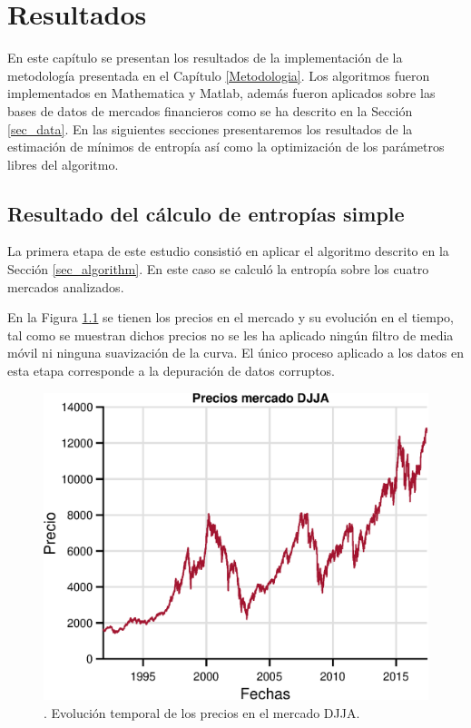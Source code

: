 %
\chapter{Resultados}
\label{Resultados}

En este capítulo se presentan los resultados de la implementación de la metodología presentada en el Capítulo \ref{Metodologia}. 
Los algoritmos fueron implementados en Mathematica y Matlab, además fueron aplicados sobre las bases de datos de mercados financieros como se ha descrito en la Sección \ref{sec_data}.
En las siguientes secciones presentaremos los resultados de la estimación de mínimos de entropía así como la optimización de los parámetros libres del algoritmo.


\section{Resultado del cálculo de entropías simple}
La primera etapa de este estudio consistió en aplicar el algoritmo descrito en la Sección \ref{sec_algorithm}.
En este caso se calculó la entropía sobre los cuatro mercados analizados. 

En la Figura \ref{precioseps} se tienen los precios en el mercado y su evolución en el tiempo, tal como se muestran dichos precios no se les ha aplicado ningún filtro de media móvil ni ninguna suavización de la curva.
El único proceso aplicado a los datos en esta etapa corresponde a la depuración de datos corruptos.

\begin{figure}[h]
	\centering
	\includegraphics[width=0.7\linewidth]{figures/precioseps}
	\caption{. Evolución temporal de los precios en el mercado DJJA.}
	\label{precioseps}
\end{figure}

